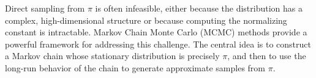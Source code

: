 \documentclass[english,graybox,envcountchap,envcountsame,sectrefs,shortlabels]{svmono}
\theoremstyle{style}
\begin{document}
Direct sampling from $\pi$ is often infeasible, either because the distribution has a complex, high-dimensional structure or because computing the normalizing constant is intractable. Markov Chain Monte Carlo (MCMC) methods provide a powerful framework for addressing this challenge. The central idea is to construct a Markov chain whose stationary distribution is precisely $\pi$, and then to use the long-run behavior of the chain to generate approximate samples from $\pi$.



\end{document}
